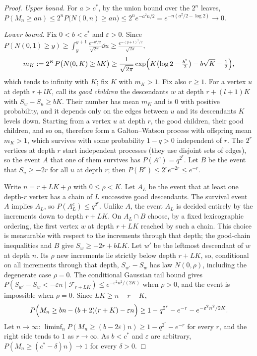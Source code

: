 \begin{proof}
\emph{Upper bound.} For $a>c^*$, by the union bound over the $2^n$ leaves, $P(M_n\ge an)\le2^nP\bigl(N(0,n)\ge an\bigr)\le2^ne^{-a^2n/2}=e^{-n(a^2/2-\log2)}\to0$.

\emph{Lower bound.} Fix $0<b<c^*$ and $\varepsilon>0$. Since $P(N(0,1)\ge y)\ge\int_y^{y+1}\frac{e^{-u^2/2}}{\sqrt{2\pi}}\dd u\ge\frac{e^{-(y+1)^2/2}}{\sqrt{2\pi}}$,
\[
m_K:=2^KP\bigl(N(0,K)\ge bK\bigr)\ge\frac1{\sqrt{2\pi}}\exp\Bigl(K\bigl(\log2-\tfrac{b^2}2\bigr)-b\sqrt K-\tfrac12\Bigr),
\]
which tends to infinity with $K$; fix $K$ with $m_K>1$. Fix also $r\ge1$. For a vertex $u$ at depth $r+lK$, call its \emph{good children} the descendants $w$ at depth $r+(l+1)K$ with $S_w-S_u\ge bK$. Their number has mean $m_K$ and is $0$ with positive
probability, and it depends only on the edges between $u$ and its descendants $K$ levels down. Starting from a vertex $u$ at depth $r$, the good children, their good children, and so on, therefore form a Galton--Watson process with
offspring mean $m_K>1$, which survives with some probability $1-q>0$ independent of $r$. The $2^r$ vertices at depth $r$ start independent processes (they use disjoint sets of edges), so the event $A$ that one of them survives has
$P(A^c)=q^{2^r}$. Let $B$ be the event that $S_u\ge-2r$ for all $u$ at depth $r$; then $P(B^c)\le2^re^{-2r}\le e^{-r}$.

Write $n=r+LK+\rho$ with $0\le\rho<K$. Let $A_L$ be the event that at least one depth-$r$ vertex has a chain of $L$ successive good descendants. The survival event $A$ implies $A_L$, so $P(A_L^c)\le q^{2^r}$. Unlike $A$, the event $A_L$ is decided entirely by the increments down to depth $r+LK$. On $A_L\cap B$ choose, by a fixed lexicographic ordering, the first vertex $w$ at depth $r+LK$ reached by such a chain. This choice is measurable with respect to the increments through that depth; the good-chain inequalities and $B$ give $S_w\ge-2r+bLK$.
Let $w'$ be the leftmost descendant of $w$ at depth $n$. Its $\rho$ new increments lie strictly below depth $r+LK$, so, conditional on all increments through that depth, $S_{w'}-S_w$ has law $N(0,\rho)$, including the degenerate case $\rho=0$. The conditional Gaussian tail bound gives $P(S_{w'}-S_w<-\varepsilon n\mid\mathcal F_{r+LK})\le e^{-\varepsilon^2n^2/(2K)}$ when $\rho>0$, and the event is impossible when $\rho=0$. Since $LK\ge n-r-K$,
\[
P\Bigl(M_n\ge bn-(b+2)(r+K)-\varepsilon n\Bigr)\ge1-q^{2^r}-e^{-r}-e^{-\varepsilon^2n^2/2K}.
\]
Let $n\to\infty$: $\liminf_nP(M_n\ge(b-2\varepsilon)n)\ge1-q^{2^r}-e^{-r}$ for every $r$, and the right side tends to $1$ as $r\to\infty$. As $b<c^*$ and $\varepsilon$ are arbitrary, $P(M_n\ge(c^*-\delta)n)\to1$ for every $\delta>0$.
\end{proof}


